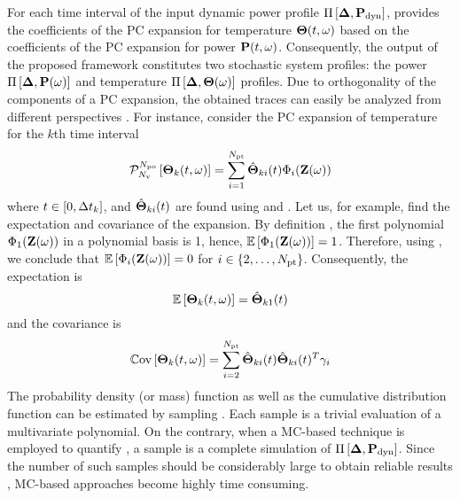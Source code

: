 For each time interval of the input dynamic power profile $\prof{\mP_\dyn}$,  provides the coefficients of the PC expansion for temperature ${\boldsymbol\Theta}(t, \omega)$ based on the coefficients of the PC expansion for power $\mathbf{P}(t, \omega)$. Consequently, the output of the proposed framework constitutes two stochastic system profiles: the power $\prof{\mP(\o)}$ and temperature $\Pi\left[\boldsymbol{\Delta}, {\boldsymbol\Theta}(\omega)\right]$ profiles. Due to orthogonality of the components of a PC expansion, the obtained traces can easily be analyzed from different perspectives \cite{eldred2009, maitre2010}. For instance, consider the PC expansion of temperature for the $k$th time interval
\begin{equation} \elabel{pc-k}
  \oPC{\vars}{\pcorder}{\vTO_k(\t, \o)} = \sum_{i = 1}^{\pcterms} \pcc{\vTO}_{ki}(\t) \pcb_i(\vZ(\o))
\end{equation}
where $t \in [0, \Delta t_k]$, and $\hat{{\boldsymbol\Theta}}_{ki}(t)$ are found using  and . Let us, for example, find the expectation and covariance of the expansion. By definition \cite{xiu2002}, the first polynomial $\Phi_1(\mathbf{Z}(\omega))$ in a polynomial basis is 1, hence, $\mathbb{E}\left[\Phi_1(\mathbf{Z}(\omega))\right] = 1$. Therefore, using , we conclude that $\mathbb{E}\left[\Phi_i(\mathbf{Z}(\omega))\right] = 0$ for $i \in \{ 2, \dotsc, {N_\text{pt}} \}$. Consequently, the expectation is
\[
  \mathbb{E}\left[{\boldsymbol\Theta}_k(t, \omega)\right] = \hat{{\boldsymbol\Theta}}_{k1}(t)
\]
and the covariance is
\[
  \mathbb{C}\text{ov}\left[{\boldsymbol\Theta}_k(t, \omega)\right] = \sum_{i = 2}^{{N_\text{pt}}} \hat{{\boldsymbol\Theta}}_{ki}(t) \hat{{\boldsymbol\Theta}}_{ki}(t)^T \gamma_i
\]
The probability density (or mass) function as well as the cumulative distribution function can be estimated by sampling . Each sample is a trivial evaluation of a multivariate polynomial. On the contrary, when a MC-based technique is employed to quantify , a sample is a complete simulation of $\prof{\mP_\dyn}$. Since the number of such samples should be considerably large to obtain reliable results \cite{xiu2009}, MC-based approaches become highly time consuming.
